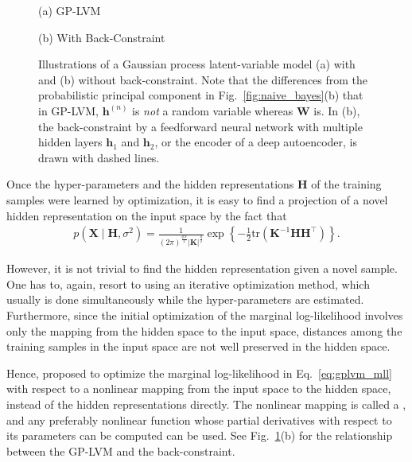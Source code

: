 \documentclass[dissertation,nocontribution,draft*]{aaltoseries}
\newcommand{\vect}[1]{\mathbf{#1}}
\newcommand{\matr}[1]{\mathbf{#1}}
\newcommand{\vh}[0]{\vect{h}}
\newcommand{\mW}[0]{\matr{W}}
\newcommand{\mX}[0]{\matr{X}}
\newcommand{\mK}[0]{\matr{K}}
\newcommand{\mH}[0]{\matr{H}}
\begin{document}
\begin{figure}[t]
    \vspace{2mm}
    \begin{minipage}{0.48\textwidth}
        \centering
        \small
        (a) GP-LVM
    \end{minipage}
    \begin{minipage}{0.48\textwidth}
        \centering
        \small
        (b) With Back-Constraint
    \end{minipage}
    \caption{Illustrations of a Gaussian process
    latent-variable model (a) with and (b) without
    back-constraint. Note that the differences from the
    probabilistic principal component in
    Fig.~\ref{fig:naive_bayes}(b) that in GP-LVM,
    $\vh^{(n)}$ is \textit{not} a random variable whereas
    $\mW$ is. In (b), the back-constraint by a feedforward
    neural network with multiple hidden layers $\vh_1$ and
    $\vh_2$, or the encoder of a deep autoencoder, is drawn
    with dashed lines.}
    \label{fig:gplvm}
\end{figure}

Once the hyper-parameters and the hidden representations
$\mH$ of the training samples were learned by
optimization, it is easy to find a projection of
a novel hidden representation on the input space by the fact
that
\begin{align*}
    p(\mX \mid \mH, \sigma^2) = \frac{1}{(2\pi)^{\frac{qN}{2}}
    \left| \mK \right|^{\frac{q}{2}}} \exp \left\{
    -\frac{1}{2} \text{tr} (\mK^{-1} \mH \mH^\top) \right\}.
\end{align*}

However, it is not trivial to find the hidden representation
given a novel sample. One has to, again, resort to using an
iterative optimization method, which usually is done
simultaneously while the hyper-parameters are estimated.
Furthermore, since the initial optimization of the marginal
log-likelihood involves only the mapping from the hidden
space to the input space, distances among the training
samples in the input space are not well preserved in the
hidden space.

Hence, \citet{Lawrence2006} proposed to optimize the
marginal log-likelihood in Eq.~\eqref{eq:gplvm_mll} with
respect to a nonlinear mapping from the input space to the
hidden space, instead of the hidden representations
directly. The nonlinear mapping is called a
, and any preferably nonlinear
function whose partial derivatives with respect to its
parameters can be computed can be used. See
Fig.~\ref{fig:gplvm}(b) for the relationship between the
GP-LVM and the back-constraint.
\end{document}
